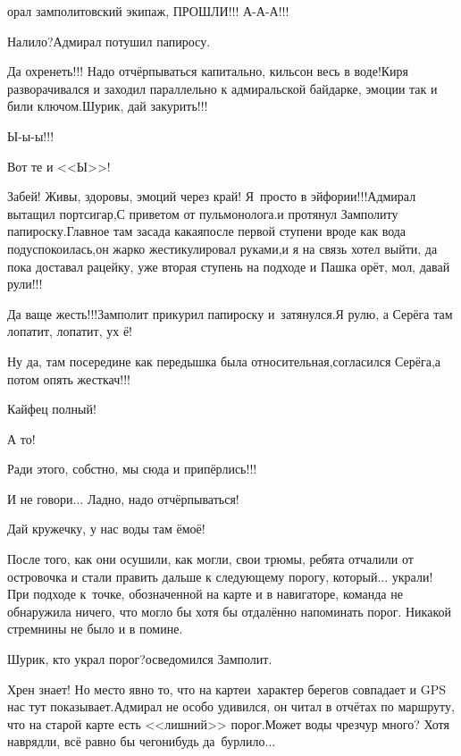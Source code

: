 \mdash орал замполитовский экипаж, {\large ПРОШЛИ!!!} {\large А-А-А!!!}

\diagdash Налило?\mdash Адмирал потушил папиросу.

\diagdash Да охренеть!!! Надо отчёрпываться капитально, кильсон весь в воде!\mdash Киря разворачивался и заходил параллельно к адмиральской байдарке, эмоции так и били ключом.\mdash Шурик, дай закурить!!!

\diagdash Ы-ы-ы!!!

\diagdash Вот те и <<Ы>>!

\diagdash Забей! Живы, здоровы, эмоций через край! Я~просто в эйфории!!!\mdash Адмирал вытащил портсигар,\mdash С приветом от пульмонолога.\mdash и протянул Замполиту папироску.\mdash Главное там засада какая\mdash после первой ступени вроде как вода подуспокоилась,\mdash он жарко жестикулировал руками,\mdash и я на связь хотел выйти, да пока доставал рацейку, уже вторая ступень на подходе и Пашка орёт, мол, давай рули!!!

\diagdash Да ваще жесть!!!\mdash Замполит прикурил папироску и~затянулся.\mdash Я рулю, а Серёга там лопатит, лопатит, ух ё!

\diagdash Ну да, там посередине как передышка была относительная,\mdash согласился Серёга,\mdash а потом опять жесткач!!!

\diagdash Кайфец полный!

\diagdash А то!

\diagdash Ради этого, собстно, мы сюда и припёрлись!!!

\diagdash И не говори$\ldots$ Ладно, надо отчёрпываться!

\diagdash Дай кружечку, у нас воды там ё\sdash моё!

После того, как они осушили, как могли, свои трюмы, ребята отчалили от островочка и стали править дальше к следующему порогу, который... украли! При подходе к~точке, обозначенной на карте и в навигаторе, команда не обнаружила ничего, что могло бы хотя бы отдалённо напоминать порог. Никакой стремнины не было и в помине.

\diagdash Шурик, кто украл порог?\mdash осведомился Замполит. 

\diagdash Хрен знает! Но место явно то, что на карте\mdash и~характер берегов совпадает и GPS нас тут показывает.\mdash Адмирал не особо удивился, он читал в отчётах по маршруту, что на старой карте есть <<лишний>> порог.\mdash Может воды чрезчур много? Хотя наврядли, всё равно бы чего\sdash нибудь да~бурлило$\ldots$

